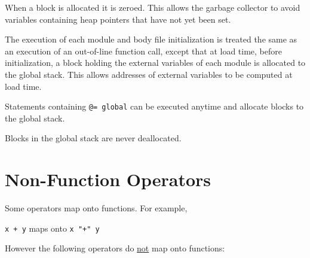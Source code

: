 \documentclass[12pt]{article}
\begin{document}
When a block is allocated it is zeroed.  This
allows the garbage collector to avoid variables containing
heap pointers that have not yet been set.

The execution of each module and body file initialization is
treated the same as an execution of an out-of-line function
call, except that at load time, before initialization,
a block holding the external variables of each module is
allocated to the global stack\label{GLOBAL-MEMORY}.  This allows addresses of
external variables to be computed at load time.

Statements containing {\tt @= global} can be executed anytime
and allocate blocks to the global stack.

Blocks in the global stack are never deallocated.

\section{Non-Function Operators}

Some operators map onto functions.  For example, \\
\centerline{{\tt x + y} maps onto {\tt x "+" y}}

However the following operators do \underline{not} map onto functions:
\end{document}
